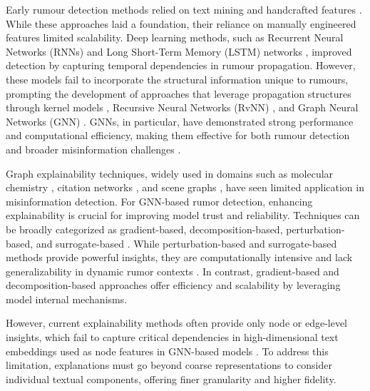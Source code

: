 Early rumour detection methods relied on text mining and handcrafted features \cite{castillo2011information, yang2012automatic, liu2015real}. While these approaches laid a foundation, their reliance on manually engineered features limited scalability. 
Deep learning methods, such as Recurrent Neural Networks (RNNs) \cite{ma2016detecting} and Long Short-Term Memory (LSTM) networks \cite{kochkina-etal-2017-turing}, improved detection by capturing temporal dependencies in rumour propagation.
However, these models fail to incorporate the structural information unique to rumours, prompting the development of approaches that leverage propagation structures through kernel models \cite{ma2017detect}, Recursive Neural Networks (RvNN) \cite{ma2018rumor}, and Graph Neural Networks (GNN) \cite{Bian2020RumorDO, wei-etal-2021-towards, lin-etal-2021-rumor}. GNNs, in particular, have demonstrated strong performance and computational efficiency, making them effective for both rumour detection and broader misinformation challenges \cite{phan2023fake, guo2022survey}.

Graph explainability techniques, widely used in domains such as molecular chemistry \cite{reiser2022graph, li2021graph}, citation networks \cite{xiao2022graph, chunaev2020community}, and scene graphs \cite{chang2021comprehensive, zareian2020bridging}, have seen limited application in misinformation detection. For GNN-based rumor detection, enhancing explainability is crucial for improving model trust and reliability. Techniques can be broadly categorized as gradient-based, decomposition-based, perturbation-based, and surrogate-based \cite{yuan2022explainability}. While perturbation-based and surrogate-based methods provide powerful insights, they are computationally intensive and lack generalizability in dynamic rumor contexts \cite{yuan2022explainability}. In contrast, gradient-based and decomposition-based approaches offer efficiency and scalability by leveraging model internal mechanisms.

However, current explainability methods often provide only node or edge-level insights, which fail to capture critical dependencies in high-dimensional text embeddings used as node features in GNN-based models \cite{Bian2020RumorDO, wei-etal-2021-towards, lin-etal-2021-rumor}. To address this limitation, explanations must go beyond coarse representations to consider individual textual components, offering finer granularity and higher fidelity.

